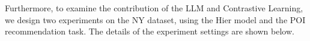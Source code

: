 



   Furthermore, to examine the contribution of the LLM and Contrastive Learning, we design two experiments on the NY dataset, using the Hier model and the POI recommendation task. The details of the experiment settings are shown below. 

   \begin{table}[htbp]
    \centering
         \caption{The attributes of two similar POIs.} 
        \label{tab:additional_ablation}
    \end{table}
    

